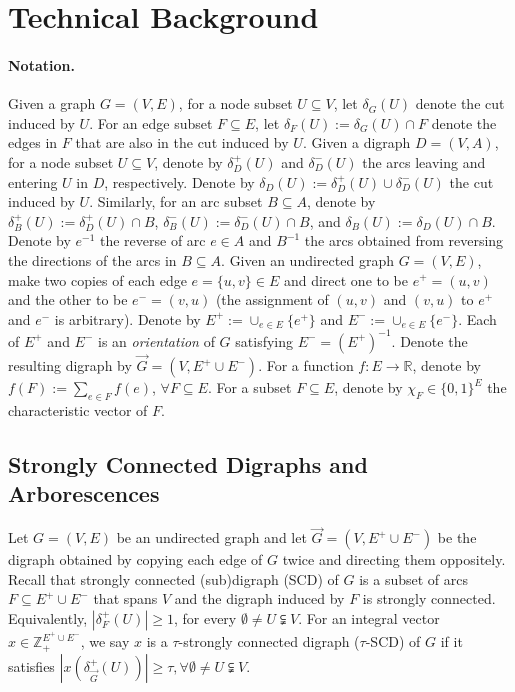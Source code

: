\documentclass[runningheads]{llncs}
\newcommand{\R}{\mathbb{R}}
\newcommand{\Z}{\mathbb{Z}}
\begin{document}
\section{Technical Background}

\paragraph{Notation.} Given a graph $G=(V,E)$, for a node subset $U\subseteq V$, let $\delta_G(U)$ denote the cut induced by $U$. For an edge subset $F\subseteq E$, let $\delta_F(U):=\delta_G(U)\cap F$ denote the edges in $F$ that are also in the cut induced by $U$. 
Given a digraph $D=(V,A)$, for a node subset $U\subseteq V$, denote by $\delta_D^+(U)$ and $\delta_D^-(U)$ the arcs leaving and entering $U$ in $D$, respectively. Denote by $\delta_D(U):=\delta_D^+(U)\cup \delta_D^-(U)$ the cut induced by $U$. Similarly, for an arc subset $B\subseteq A$, denote by $\delta_B^+(U):=\delta_D^+(U)\cap B$, $\delta_B^-(U):=\delta_D^-(U)\cap B$, and $\delta_B(U):=\delta_D(U)\cap B$. 
Denote by $e^{-1}$ the reverse of arc $e\in A$ and $B^{-1}$ the arcs obtained from reversing the directions of the arcs in $B\subseteq A$. 
Given an undirected graph $G=(V,E)$, make two copies of each edge $e=\{u,v\}\in E$ and direct one to be $e^+=(u,v)$ and the other to be $e^-=(v,u)$ (the assignment of $(u,v)$ and $(v,u)$ to $e^+$ and $e^-$ is arbitrary). Denote by $E^+:=\cup_{e\in E}\{e^+\}$ and $E^-:=\cup_{e\in E}\{e^-\}$. Each of $E^+$ and $E^-$ is an \textit{orientation} of $G$ satisfying $E^-=(E^+)^{-1}$. Denote the resulting digraph by $\vec{G}=(V,E^+\cup E^-)$.
For a function $f:E\rightarrow \R$, denote by $f(F):=\sum_{e\in F}f(e)$, $\forall F\subseteq E$. For a subset $F\subseteq E$, denote by $\chi_F\in\{0,1\}^E$ the characteristic vector of $F$.




\subsection{Strongly Connected Digraphs and Arborescences}\label{sec:SCD}






Let $G=(V,E)$ be an undirected graph and let $\vec{G}=(V,E^+\cup E^-)$ be the digraph obtained by copying each edge of $G$ twice and directing them oppositely. Recall that strongly connected (sub)digraph (SCD) of $G$ is a subset of arcs $F\subseteq E^+\cup E^-$ that spans $V$ and the digraph induced by $F$ is strongly connected. Equivalently, $|\delta^+_{F}(U)|\geq 1$, for every $\emptyset \neq U\subsetneqq V$. For an integral vector $x\in\Z^{E^+\cup E^-}_+$, we say $x$ is a $\tau$-strongly connected digraph ($\tau$-SCD) of $G$ if it satisfies $|x(\delta^+_{\vec{G}}(U))|\geq \tau, \forall \emptyset \neq U\subsetneqq V$. 
\end{document}
